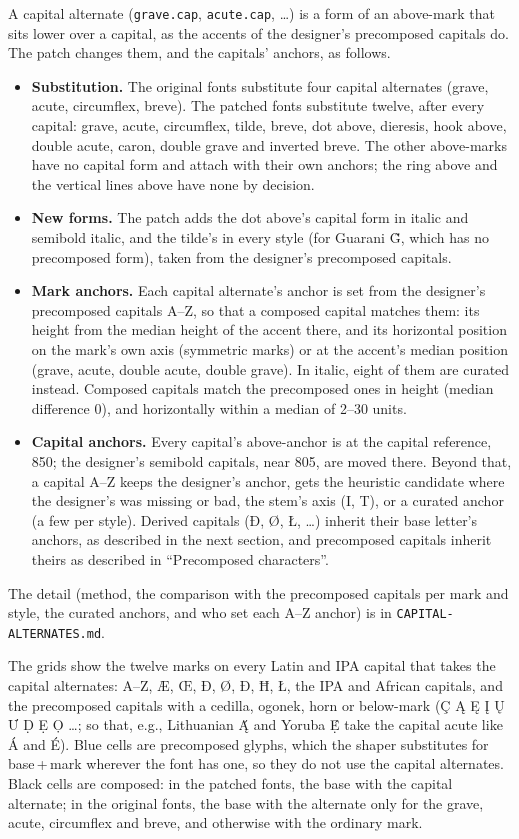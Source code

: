 \documentclass[landscape]{article}
\begin{document}
A capital alternate (\verb|grave.cap|, \verb|acute.cap|, \ldots) is a form of an above-mark that sits lower over a capital, 
as the accents of the designer's precomposed capitals do.
The patch changes them, and the capitals' anchors, as follows.
\begin{itemize}
\item \textbf{Substitution.} The original fonts substitute four capital alternates (grave, acute, circumflex, breve).
The patched fonts substitute twelve, after every capital: grave, acute, circumflex, tilde, breve, dot above, dieresis, 
hook above, double acute, caron, double grave and inverted breve.
The other above-marks have no capital form and attach with their own anchors; the ring above and the vertical lines above have none by decision.
\item \textbf{New forms.} The patch adds the dot above's capital form in italic and semibold italic, and the tilde's in every style 
(for Guarani G̃, which has no precomposed form), taken from the designer's precomposed capitals.
\item \textbf{Mark anchors.} Each capital alternate's anchor is set from the designer's precomposed capitals A--Z, so that a composed capital matches them:
its height from the median height of the accent there, and its horizontal position on the mark's own axis (symmetric marks) or at the accent's median position 
(grave, acute, double acute, double grave).
In italic, eight of them are curated instead.
Composed capitals match the precomposed ones in height (median difference 0), and horizontally within a median of 2--30 units.
\item \textbf{Capital anchors.} Every capital's above-anchor is at the capital reference, 850; the designer's semibold capitals, near 805, are moved there.
Beyond that, a capital A--Z keeps the designer's anchor, gets the heuristic candidate where the designer's was missing or bad, the stem's axis (I, T), 
or a curated anchor (a few per style).
Derived capitals (Ð, Ø, Ł, \ldots) inherit their base letter's anchors, as described in the next section, 
and precomposed capitals inherit theirs as described in ``Precomposed characters''.
\end{itemize}
The detail (method, the comparison with the precomposed capitals per mark and style, the curated anchors, and who set each A--Z anchor) is in \verb|CAPITAL-ALTERNATES.md|.

The grids show the twelve marks on every Latin and IPA capital that takes the capital alternates: A--Z, Æ, Œ, Ð, Ø, Đ, Ħ, Ł, the IPA and African capitals,
and the precomposed capitals with a cedilla, ogonek, horn or below-mark (Ç Ą Ę Į Ų Ư Ḍ Ẹ Ọ \ldots; so that, e.g., Lithuanian Ą́ and Yoruba Ẹ́ take the capital acute like Á and É).
Blue cells are precomposed glyphs, which the shaper substitutes for base\,+\,mark wherever the font has one, so they do not use the capital alternates.
Black cells are composed: in the patched fonts, the base with the capital alternate; in the original fonts, 
the base with the alternate only for the grave, acute, circumflex and breve, and otherwise with the ordinary mark.
\end{document}
